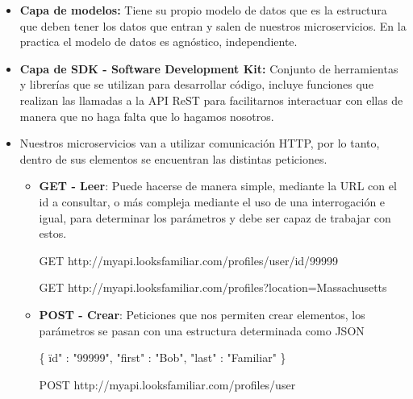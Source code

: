 \documentclass[12pt]{report} %
\begin{document}
\begin{itemize}
	\item \textbf{Capa de modelos:} Tiene su propio modelo de datos que es la estructura que deben tener los datos que entran y salen de nuestros microservicios. En la practica el modelo de datos es agnóstico, independiente.
	\item \textbf{Capa de SDK - Software Development Kit:} Conjunto de herramientas y librerías que se utilizan para desarrollar código, incluye funciones que realizan las llamadas a la API ReST para facilitarnos interactuar con ellas de manera que no haga falta que lo hagamos nosotros.
	\item Nuestros microservicios van a utilizar comunicación HTTP, por lo tanto, dentro de sus elementos se encuentran las distintas peticiones.
	\begin{itemize}
		\item \textbf{GET - Leer}: Puede hacerse de manera simple, mediante la URL con el id a consultar, o más compleja mediante el uso de una interrogación e igual, para determinar los parámetros y debe ser capaz de trabajar con estos.
		
		GET http://myapi.looksfamiliar.com/profiles/user/id/99999

		GET http://myapi.looksfamiliar.com/profiles?location=Massachusetts

		\item \textbf{POST - Crear}: Peticiones que nos permiten crear elementos, los parámetros se pasan con una estructura determinada como JSON
		
		\{ \"id" : "99999", "first" : "Bob", "last" : "Familiar" \}

		POST http://myapi.looksfamiliar.com/profiles/user
		

\end{itemize}
\end{itemize}
\end{document}
